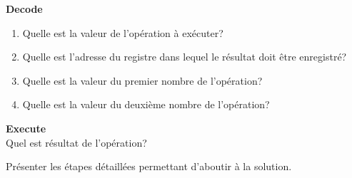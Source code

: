 \begin{Exercice}[5 minutes] \textbf{Decode}
    \begin{enumerate}
        \item Quelle est la valeur de l'opération à exécuter?
        \item Quelle est l'adresse du registre dans lequel le résultat doit être enregistré?
        \item Quelle est la valeur du premier nombre de l'opération?
        \item Quelle est la valeur du deuxième nombre de l'opération?
    \end{enumerate}
\end{Exercice}

\begin{Exercice}[5 minutes] \textbf{Execute}\\
    Quel est résultat de l'opération?
\end{Exercice}

\begin{conseil}
    
\end{conseil}
\begin{solution}
    Présenter les étapes détaillées permettant d'aboutir à la solution.
\end{solution}

